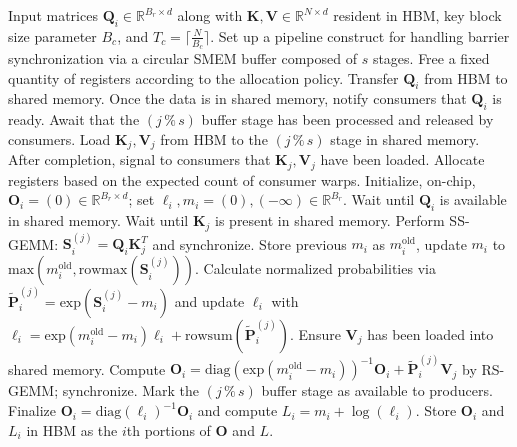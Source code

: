 \begin{algorithm}[H]
    \caption{\small\label{alg:flash3_wgmma_ws_only}\textsc{FlashAttention-3} forward pass \textbf{excluding} intra-consumer overlap -- CTA perspective}
    \begin{algorithmic}[1]
\REQUIRE Input matrices $\mathbf{Q}_i \in \mathbb{R}^{B_r \times d}$ along with $\mathbf{K}, \mathbf{V} \in \mathbb{R}^{N \times d}$ resident in HBM, key block size parameter $B_c$, and $T_c = \lceil \frac{N}{B_c} \rceil$.
\STATE Set up a pipeline construct for handling barrier synchronization via a circular SMEM buffer composed of $s$ stages.
\STATE Free a fixed quantity of registers according to the allocation policy.
\STATE Transfer $\mathbf{Q}_i$ from HBM to shared memory.
\STATE Once the data is in shared memory, notify consumers that $\mathbf{Q}_i$ is ready.
    \STATE Await that the $(j\,\%\,s)$ buffer stage has been processed and released by consumers.
    \STATE Load $\mathbf{K}_j, \mathbf{V}_j$ from HBM to the $(j\,\%\,s)$ stage in shared memory.
    \STATE After completion, signal to consumers that $\mathbf{K}_j, \mathbf{V}_j$ have been loaded.
\ENDFOR
\ELSE
\STATE Allocate registers based on the expected count of consumer warps.
\STATE Initialize, on-chip, $\mathbf{O}_i = (0) \in \mathbb{R}^{B_r \times d}$; set $\ell_i, m_i = (0), (-\infty) \in \mathbb{R}^{B_r}$.
\STATE Wait until $\mathbf{Q}_i$ is available in shared memory.
\STATE Wait until $\mathbf{K}_j$ is present in shared memory.
\STATE Perform SS-GEMM: $\mathbf{S}_i^{(j)} = \mathbf{Q}_i \mathbf{K}_j^T$ and synchronize. \label{alg:ws_only_gemm1}
\STATE Store previous $m_i$ as $m_i^{\mathrm{old}}$, update $m_i$ to $\mathrm{max}(m_i^{\mathrm{old}}, \mathrm{rowmax}(\mathbf{S}_i^{(j)}))$. \label{code-ws:softmax_start}
\STATE Calculate normalized probabilities via $\widetilde{\mathbf{P}}_i^{(j)} = \mathrm{exp}(\mathbf{S}_i^{(j)} - m_i)$ and update $\ell_i$ with $\ell_i = \mathrm{exp}(m_i^{\mathrm{old}} - m_i) \ell_i + \mathrm{rowsum}(\widetilde{\mathbf{P}}_i^{(j)})$. \label{code-ws:softmax_end}
\STATE Ensure $\mathbf{V}_j$ has been loaded into shared memory.
\STATE Compute $\mathbf{O}_i = \mathrm{diag}(\mathrm{exp}(m_i^{\mathrm{old}} - m_i))^{-1} \mathbf{O}_i + \widetilde{\mathbf{P}}_i^{(j)} \mathbf{V}_j$ by RS-GEMM; synchronize. \label{alg:ws_only_gemm2}
\STATE Mark the $(j\,\%\,s)$ buffer stage as available to producers.
\ENDFOR
\STATE Finalize $\mathbf{O}_i = \mathrm{diag}(\ell_i)^{-1} \mathbf{O}_i$ and compute $L_i = m_i + \log(\ell_i)$.
\STATE Store $\mathbf{O}_i$ and $L_i$ in HBM as the $i$th portions of $\mathbf{O}$ and $L$.
\ENDIF
\end{algorithmic}
\end{algorithm}

